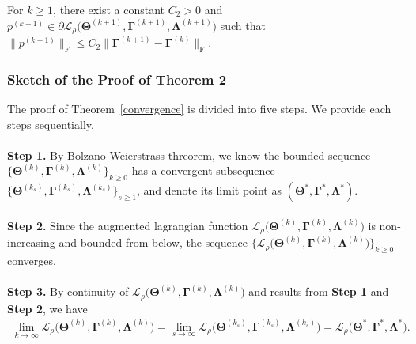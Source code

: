 \documentclass[alpha-refs]{wiley-article}
\begin{document}
\begin{lemma} \label{Lemma2.4}
For $k\geq 1$, there exist a constant $C_{2}>0$ and $p^{(k+1)}\in\partial \mathcal{L}_{\rho} \big( \boldsymbol{\Theta}^{(k+1)},\boldsymbol{\Gamma}^{(k+1)},\boldsymbol{\Lambda}^{(k+1)} \big)$ such that $\|p^{(k+1)}\|_{\text{F}}\leq C_{2} \| \boldsymbol{\Gamma}^{(k+1)} - \boldsymbol{\Gamma}^{(k)} \|_{\text{F}}$.
\end{lemma}

\subsubsection{Sketch of the Proof of Theorem 2} \label{proof_conv}
The proof of Theorem~\ref{convergence} is divided into five steps.
We provide each steps sequentially.\\ \\
{\textbf{Step 1.}}
By Bolzano-Weierstrass threorem, we know the bounded sequence $\{\boldsymbol{\Theta}^{(k)},\boldsymbol{\Gamma}^{(k)},\boldsymbol{\Lambda}^{(k)}\}_{k \geq 0}$ has a convergent subsequence
$\{\boldsymbol{\Theta}^{(k_{s})},\boldsymbol{\Gamma}^{(k_{s})},\boldsymbol{\Lambda}^{(k_{s})}\}_{s \geq 1}$, and denote its limit point as $(\boldsymbol{\Theta}^{*},\boldsymbol{\Gamma}^{*},\boldsymbol{\Lambda}^{*})$.
\\ \\
{\textbf{Step 2.}}
Since the augmented lagrangian function $\mathcal{L}_{\rho} \big( \boldsymbol{\Theta}^{(k)},\boldsymbol{\Gamma}^{(k)},\boldsymbol{\Lambda}^{(k)} \big)$ is non-increasing and bounded from below,
the sequence $\{\mathcal{L}_{\rho} \big( \boldsymbol{\Theta}^{(k)},\boldsymbol{\Gamma}^{(k)},\boldsymbol{\Lambda}^{(k)} \big)\}_{k \geq 0}$ converges.
\\ \\
{\textbf{Step 3.}}
By continuity of $\mathcal{L}_{\rho} \big( \boldsymbol{\Theta}^{(k)},\boldsymbol{\Gamma}^{(k)},\boldsymbol{\Lambda}^{(k)} \big)$ and results from \textbf{Step 1} and \textbf{Step 2}, we have
\begin{align*}
    \lim_{k\rightarrow{\infty}} \mathcal{L}_{\rho} \big( \boldsymbol{\Theta}^{(k)},\boldsymbol{\Gamma}^{(k)},\boldsymbol{\Lambda}^{(k)} \big)
    = \lim_{s\rightarrow{\infty}} \mathcal{L}_{\rho} \big( \boldsymbol{\Theta}^{(k_{s})},\boldsymbol{\Gamma}^{(k_{s})},\boldsymbol{\Lambda}^{(k_{s})} \big)
    = \mathcal{L}_{\rho} \big( \boldsymbol{\Theta}^{*},\boldsymbol{\Gamma}^{*},\boldsymbol{\Lambda}^{*} \big).
\end{align*}
\end{document}
